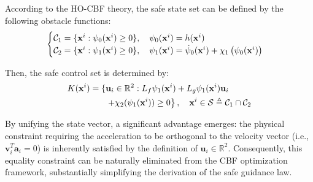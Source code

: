 \documentclass[lettersize,journal]{IEEEtran}
\begin{document}
According to the HO-CBF theory, the safe state set can be defined by the following obstacle functions:
\begin{equation}
	\label{obs_func}
	\begin{cases}
		{{\cal C}_1} = \{ \mathbf{x}^i:{\psi _0}(\mathbf{x}^i) \ge 0\}, \quad {\psi _0}(\mathbf{x}^i) = h(\mathbf{x}^i)\\
		{{\cal C}_2} = \{ \mathbf{x}^i:{\psi _1}(\mathbf{x}^i) \ge 0\}, \quad {\psi _1}(\mathbf{x}^i) = {{\dot \psi }_0}(\mathbf{x}^i) + {\chi _1}\left( {{\psi _0}(\mathbf{x}^i)} \right)
	\end{cases}
\end{equation}

Then, the safe control set is determined by:
\begin{equation}
	\begin{split}
		K(\mathbf{x}^i) = \{ & \mathbf{u}_i \in {\mathbb{R}^2} : L_{f}{\psi _1}(\mathbf{x}^i) + {L_{g}}{\psi _1}(\mathbf{x}^i)\mathbf{u}_i \\
		& \left. + {\chi _2}({\psi _1}(\mathbf{x}^i)) \ge 0 \right\}, \quad \mathbf{x}^i \in {\cal S} \triangleq {{\cal C}_1} \cap {{\cal C}_2}
	\end{split}
\end{equation}

By unifying the state vector, a significant advantage emerges: the physical constraint requiring the acceleration to be orthogonal to the velocity vector (i.e., ${\boldsymbol{v}}_i^T {\boldsymbol{a}}_i = 0$) is inherently satisfied by the definition of $\mathbf{u}_i \in \mathbb{R}^2$. Consequently, this equality constraint can be naturally eliminated from the CBF optimization framework, substantially simplifying the derivation of the safe guidance law.
\end{document}
